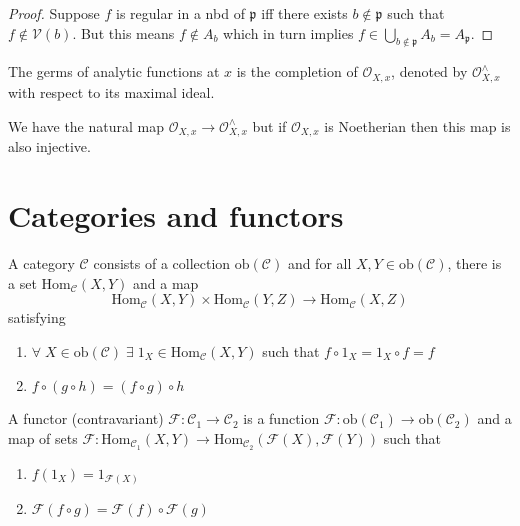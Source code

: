 \documentclass[oneside, 12pt]{scrbook}
\newcommand{\V}{\mathcal{V}}
\newcommand{\pr}{\mathfrak{p}}
\theoremstyle{theorem}
\begin{document}
\begin{proof}
Suppose $f$ is regular in a nbd of $\pr$ iff there exists $b \not \in \pr $ such that $f \not \in \V(b)$. But this means $f \not \in A_{b}$ which in turn implies $f \in \bigcup_{b \not \in \pr} A_{b} = A_{\pr}$.
\end{proof}

\begin{definition}
The germs of analytic functions at $x$ is the completion of $\mathcal{O}_{X,x}$, denoted by $\mathcal{O}_{X,x}^{\wedge}$ with respect to its maximal ideal. 
\end{definition}

\begin{remark}
We have the natural map $\mathcal{O}_{X,x} \rightarrow \mathcal{O}_{X,x}^{\wedge}$ but if $\mathcal{O}_{X,x}$ is Noetherian then this map is also injective. 
\end{remark}

\section{Categories and functors}

A category $\mathcal{C}$ consists of a collection $\mathrm{ob}(\mathcal{C})$ and for all $X,Y \in \mathrm{ob}(\mathcal{C})$, there is a set $\mathrm{Hom}_{\mathcal{C}}(X,Y)$ and a map $$\mathrm{Hom}_{\mathcal{C}}(X,Y) \times \mathrm{Hom}_{\mathcal{C}}(Y,Z) \rightarrow \mathrm{Hom}_{\mathcal{C}}(X,Z)$$ satisfying 
\begin{enumerate}
\item $\forall \; X \in \mathrm{ob}(\mathcal{C}) \; \exists \; 1_{X} \in \mathrm{Hom}_{\mathcal{C}}(X,Y)$ such that $f \circ 1_{X} = 1_{X} \circ f = f$
\item $f \circ (g \circ h) = (f \circ g)\circ h$
\end{enumerate}

A functor (contravariant) $\mathcal{F}: \mathcal{C}_{1} \rightarrow \mathcal{C}_{2}$ is a function $\mathcal{F}: \mathrm{ob}(\mathcal{C}_{1}) \rightarrow \mathrm{ob}(\mathcal{C}_{2})$ and a map of sets $\mathcal{F}: \mathrm{Hom}_{\mathcal{C}_{1}}(X,Y)\rightarrow \mathrm{Hom}_{\mathcal{C}_{2}}(\mathcal{F}(X),\mathcal{F}(Y))$ such that 
\begin{enumerate}
\item $f(1_{X}) = 1_{\mathcal{F}(X)}$
\item $\mathcal{F}(f \circ g) = \mathcal{F}(f) \circ \mathcal{F}(g)$
\end{enumerate}
\end{document}
